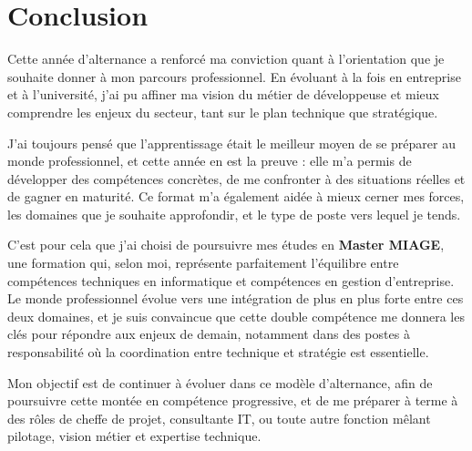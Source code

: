 \section{Conclusion}
\label{conclusion}

Cette année d’alternance a renforcé ma conviction quant à l’orientation que je souhaite donner à mon parcours professionnel. En évoluant à la fois en entreprise et à l’université, j’ai pu affiner ma vision du métier de développeuse et mieux comprendre les enjeux du secteur, tant sur le plan technique que stratégique.

J’ai toujours pensé que l’apprentissage était le meilleur moyen de se préparer au monde professionnel, et cette année en est la preuve : elle m’a permis de développer des compétences concrètes, de me confronter à des situations réelles et de gagner en maturité. Ce format m’a également aidée à mieux cerner mes forces, les domaines que je souhaite approfondir, et le type de poste vers lequel je tends.

C’est pour cela que j’ai choisi de poursuivre mes études en \textbf{Master MIAGE}, une formation qui, selon moi, représente parfaitement l’équilibre entre compétences techniques en informatique et compétences en gestion d’entreprise. Le monde professionnel évolue vers une intégration de plus en plus forte entre ces deux domaines, et je suis convaincue que cette double compétence me donnera les clés pour répondre aux enjeux de demain, notamment dans des postes à responsabilité où la coordination entre technique et stratégie est essentielle.

Mon objectif est de continuer à évoluer dans ce modèle d’alternance, afin de poursuivre cette montée en compétence progressive, et de me préparer à terme à des rôles de cheffe de projet, consultante IT, ou toute autre fonction mêlant pilotage, vision métier et expertise technique.